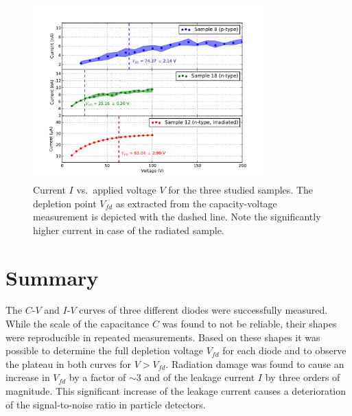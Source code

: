 \documentclass[11pt,a4paper]{report}
\begin{document}
\begin{figure}
  \centering
  \includegraphics[width=0.8\textwidth]{./figures/iv.pdf}
  \caption{Current $I$ vs.\ applied voltage $V$ for the three studied samples. The depletion point $V_{fd}$ as extracted from the capacity-voltage measurement is depicted with the dashed line. Note the significantly higher current in case of the radiated sample.}\label{fig:iv}
\end{figure}



\section*{Summary}
\label{sec:summary}

The $C$-$V$ and $I$-$V$ curves of three different diodes were successfully measured.
While the scale of the capacitance $C$ was found to not be reliable, their shapes were reproducible in repeated measurements.
Based on these shapes it was possible to determine the full depletion voltage $V_{fd}$ for each diode and to observe the plateau in both curves for $V>V_{fd}$.
Radiation damage was found to cause an increase in $V_{fd}$ by a factor of $\sim 3$ and of the leakage current $I$ by three orders of magnitude.
This significant increase of the leakage current causes a deterioration of the signal-to-noise ratio in particle detectors.

\printbibliography
\end{document}
